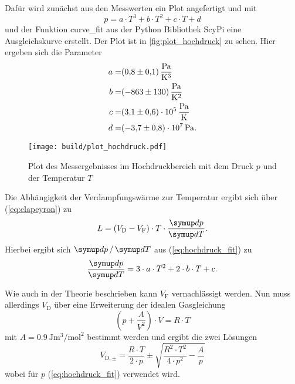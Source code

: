 Dafür wird zunächst aus den Messwerten ein Plot angefertigt und mit
\begin{equation}
    p = a \cdot T^3 + b \cdot T^2 + c \cdot T + d
    \label{eq:hochdruck_fit}
\end{equation}
und der Funktion curve\_fit aus der Python Bibliothek ScyPi eine Ausgleichskurve erstellt.\cite{scipy}
Der Plot ist in \autoref{fig:plot_hochdruck} zu sehen.
Hier ergeben sich die Parameter
\begin{align*}
    a =& \SI{0.8+-0.1}{\pascal\per\kelvin\cubed} \\
    b =& \SI{-863+-130}{\pascal\per\kelvin\squared} \\
    c =& \SI{3.1+-0.6e5}{\pascal\per\kelvin} \\
    d =& \SI{-3.7+-0.8e7}{\pascal}.
\end{align*}

\begin{figure}
    \centering
    \texttt{[image: build/plot\_hochdruck.pdf]}
    \caption{Plot des Messergebnisses im Hochdruckbereich mit dem Druck $p$ und der Temperatur $T$}
    \label{fig:plot_hochdruck}
\end{figure}

Die Abhängigkeit der Verdampfungswärme zur Temperatur ergibt sich über (\ref{eq:clapeyron}) zu
\begin{equation}
    L = (V_\text{D}-V_\text{F}) \cdot T \cdot \frac{\dif{p}}{\dif{T}}.
    \label{eq:hochdruck_ergebnis}
\end{equation}
Hierbei ergibt sich $\dif{p}/\dif{T}$ aus (\ref{eq:hochdruck_fit}) zu
\begin{equation}
    \frac{\dif{p}}{\dif{T}} = 3 \cdot a \cdot T^2 + 2 \cdot b \cdot T + c.
    \label{eq:ableitung}
\end{equation}

Wie auch in der Theorie beschrieben kann $V_\text{F}$ vernachlässigt werden. 
Nun muss allerdings $V_\text{D}$ über eine Erweiterung der idealen Gasgleichung
\begin{equation}
    \left( p + \frac{A}{V^2} \right) \cdot V = R \cdot T
\end{equation}
mit $A = \SI{0.9}{\joule\meter\cubed\per\mol\squared}$ bestimmt werden und ergibt die zwei Lösungen
\begin{equation}
    V_{\text{D},\pm} = \frac{R \cdot T}{2 \cdot p} \pm \sqrt{\frac{R^2 \cdot T^2}{4 \cdot p^2} - \frac{A}{p}}
\end{equation}
wobei für $p$ (\ref{eq:hochdruck_fit}) verwendet wird.\cite{V203}

